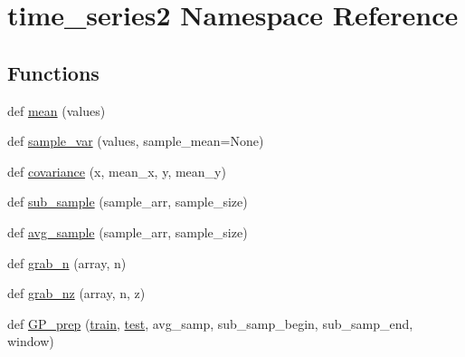 \hypertarget{namespacetime__series2}{}\section{time\+\_\+series2 Namespace Reference}
\label{namespacetime__series2}
\subsection*{Functions}
\begin{DoxyCompactItemize}
\item 
def \mbox{\hyperlink{namespacetime__series2_a91a50d414e62104b3c4df302683fa374}{mean}} (values)
\item 
def \mbox{\hyperlink{namespacetime__series2_a2fb326ca63610119cde08d76b52599fe}{sample\+\_\+var}} (values, sample\+\_\+mean=None)
\item 
def \mbox{\hyperlink{namespacetime__series2_afb06c28c1769268d33ce21dfae5d064a}{covariance}} (x, mean\+\_\+x, y, mean\+\_\+y)
\item 
def \mbox{\hyperlink{namespacetime__series2_ab7308a3396727b46466322d617ea0af5}{sub\+\_\+sample}} (sample\+\_\+arr, sample\+\_\+size)
\item 
def \mbox{\hyperlink{namespacetime__series2_a831b2ebbb3b93f1a189a11b798867bf2}{avg\+\_\+sample}} (sample\+\_\+arr, sample\+\_\+size)
\item 
def \mbox{\hyperlink{namespacetime__series2_a31fa5faf99bfb7d4e08f53e5f04d77e0}{grab\+\_\+n}} (array, n)
\item 
def \mbox{\hyperlink{namespacetime__series2_a82eef0f2d8234468ad48ed485a433494}{grab\+\_\+nz}} (array, n, z)
\item 
def \mbox{\hyperlink{namespacetime__series2_a132464d53987913f012c331095a66ccd}{G\+P\+\_\+prep}} (\mbox{\hyperlink{namespacetime__series2_a217725c41e0be8eff877ccf0738ca225}{train}}, \mbox{\hyperlink{namespacetime__series2_a1db23c9847b01280de0f7b35c02ec33d}{test}}, avg\+\_\+samp, sub\+\_\+samp\+\_\+begin, sub\+\_\+samp\+\_\+end, window)
\end{DoxyCompactItemize}
